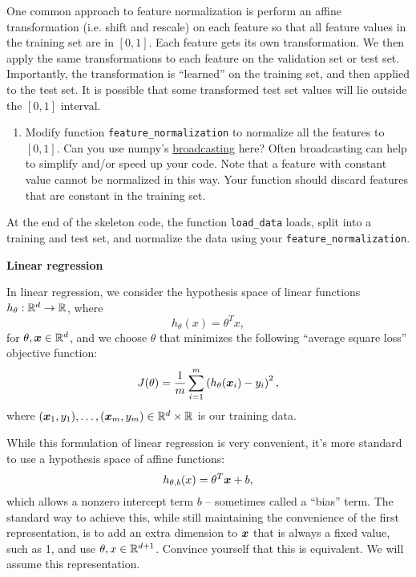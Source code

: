 \documentclass{article}
\newcommand{\nyuparagrah}[1]{\textcolor{nyupurple}{\large #1}}
\begin{document}
One common approach to feature normalization is perform
an affine transformation (i.e. shift and rescale) on each feature
so that all feature values in the training set are in $[0,1]$. Each
feature gets its own transformation. We then apply the same transformations
to each feature on the validation set or test set. Importantly, the transformation is ``learned'' on the
training set, and then applied to the test set. It is possible that
some transformed test set values will lie outside the $[0,1]$ interval.

\begin{enumerate}
    \item Modify function \texttt{feature\_normalization} to normalize all the
features to $[0,1]$. Can you use numpy's \href{https://docs.scipy.org/doc/numpy/user/basics.broadcasting.html}{broadcasting} here? Often broadcasting can help to simplify and/or speed up your code. Note that a feature with constant value cannot be normalized in
this way. Your function should discard features that are constant
in the training set.
\setcounter{saveenum}{\value{enumi}}
\end{enumerate}

At the end of the skeleton code, the function \texttt{load\_data} loads, split into a training and test set, and normalize the data using your \texttt{feature\_normalization}.

\nyuparagrah{\bf Linear regression}

In linear regression, we consider the hypothesis space of linear functions
$h_{\theta}:\mathbb{R}^{d}\to\mathbb{R}$, where
\[
h_{\theta}(x)=\theta^{T}x,
\]
for $\theta,\boldsymbol{x}\in\mathbb{R}^{d}$, and we choose $\theta$ that minimizes
the following ``average square loss'' objective function: 
\[
J(\theta)=\frac{1}{m}\sum_{i=1}^{m}\left(h_{\theta}(\boldsymbol{x}_{i})-y_{i}\right)^{2},
\]
where $(\boldsymbol{x}_{1},y_{1}),\ldots,(\boldsymbol{x}_{m},y_{m})\in\mathbb{R}^{d}\times\mathbb{R}$
is our training data.

While this formulation of linear regression is very convenient, it's
more standard to use a hypothesis space of affine functions:
\[
h_{\theta,b}(x)=\theta^{T} \boldsymbol{x}+b,
\]
which allows a nonzero intercept term $b$ -- sometimes called a ``bias'' term. The standard
way to achieve this, while still maintaining the convenience of the
first representation, is to add an extra dimension to $\boldsymbol{x}$ that is
always a fixed value, such as 1, and use $\theta,x\in\mathbb{R}^{d+1}$. Convince yourself that
this is equivalent. 
We will assume this representation. 
\end{document}
